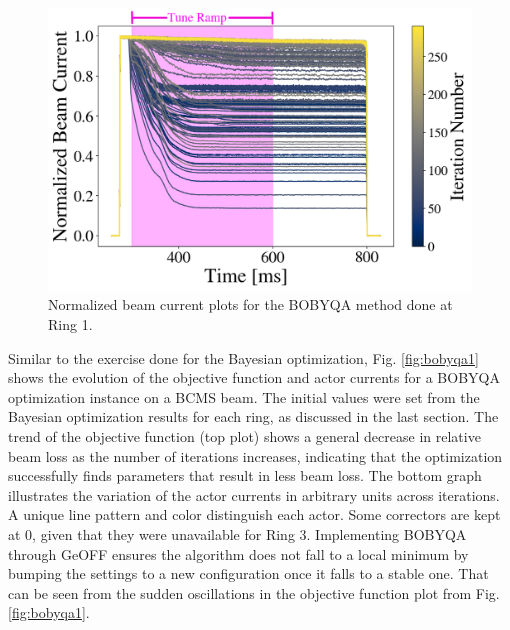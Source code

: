 \begin{figure}[H]
    \centering
    \includegraphics[width=\linewidth]{chapter5/i2_bobyqa_commented.png}
    \caption{Normalized beam current plots for the BOBYQA method done at Ring 1.}
    \label{fig:ibobyqa}
   \vspace{-1.25em}
\end{figure}

Similar to the exercise done for the Bayesian optimization, Fig. \ref{fig:bobyqa1} shows the evolution of the objective function and actor currents for a BOBYQA optimization instance on a BCMS beam. The initial values were set from the Bayesian optimization results for each ring, as discussed in the last section. The trend of the objective function (top plot) shows a general decrease in relative beam loss as the number of iterations increases, indicating that the optimization successfully finds parameters that result in less beam loss. The bottom graph illustrates the variation of the actor currents in arbitrary units across iterations. A unique line pattern and color distinguish each actor. Some correctors are kept at 0, given that they were unavailable for Ring 3. Implementing BOBYQA through GeOFF ensures the algorithm does not fall to a local minimum by bumping the settings to a new configuration once it falls to a stable one. That can be seen from the sudden oscillations in the objective function plot from Fig. \ref{fig:bobyqa1}.  

